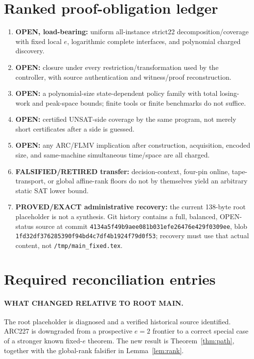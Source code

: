 \documentclass[10pt]{article}
\begin{document}
\section{Ranked proof-obligation ledger}
\begin{enumerate}
\item \textbf{OPEN, load-bearing:} uniform all-instance strict22 decomposition/coverage with
fixed local $e$, logarithmic complete interfaces, and polynomial charged discovery.
\item \textbf{OPEN:} closure under every restriction/transformation used by the controller,
with source authentication and witness/proof reconstruction.
\item \textbf{OPEN:} a polynomial-size state-dependent policy family with total losing-work
and peak-space bounds; finite tools or finite benchmarks do not suffice.
\item \textbf{OPEN:} certified UNSAT-side coverage by the same program, not merely short
certificates after a side is guessed.
\item \textbf{OPEN:} any ARC/FLMV implication after construction, acquisition, encoded size,
and same-machine simultaneous time/space are all charged.
\item \textbf{FALSIFIED/RETIRED transfer:} decision-context, four-pin online, tape-transport,
or global affine-rank floors do not by themselves yield an arbitrary static SAT lower bound.
\item \textbf{PROVED/EXACT administrative recovery:} the current 138-byte root placeholder is
not a synthesis.  Git history contains a full, balanced, OPEN-status source at commit
\texttt{4134a5f49b9aee081b031efe26476e429f0309ee}, blob
\texttt{1fd32df376285390f94bd4c7df4b1924f79d0f53}; recovery must use that actual content, not
\texttt{/tmp/main\_fixed.tex}.
\end{enumerate}

\section{Required reconciliation entries}
\paragraph{WHAT CHANGED RELATIVE TO ROOT MAIN.}
The root placeholder is diagnosed and a verified historical source identified.  ARC227 is
downgraded from a prospective $e=2$ frontier to a correct special case of a stronger known
fixed-$e$ theorem.  The new result is Theorem~\ref{thm:path}, together with the global-rank
falsifier in Lemma~\ref{lem:rank}.
\end{document}
